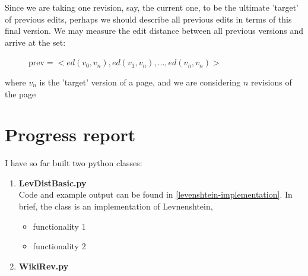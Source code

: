 \documentclass[a4paper,11pt,twoside,notitlepage]{article}
\begin{document}
        Since we are taking one revision, say, the current one, to be
        the ultimate 'target' of previous edits, perhaps we should
        describe all previous edits in terms of this final version. We
        may measure the edit distance between all previous versions
        and arrive at the set:
        
        \begin{figure}[h!]
          \centering
          $\text{prev} = <ed(v_0,v_n),ed(v_1,v_n),...,ed(v_n,v_n)>$  
        \end{figure}
        where $v_n$ is the 'target' version of a page, and we are
        considering $n$ revisions of the page

        

        \section{Progress report}
        I have so far built two python classes:
        \begin{enumerate}
          \item \textbf{LevDistBasic.py}\\
            Code and example output can be found in
            \cref{levenshtein-implementation}. In brief, the class is
            an implementation of Levnenshtein, 
 
            \begin{itemize}
              \item functionality 1
              \item functionality 2
            \end{itemize}
          \item \textbf{WikiRev.py}
        \end{enumerate}

        
        \clearpage
        \printbibheading[heading=bibintoc,title={References}]
        \printbibliography[keyword=wiki,heading=subbibliography,title={Wikipedia}]
        \printbibliography[keyword=edit,heading=subbibliography,title={Edit
            distance}]
        
\end{document}
